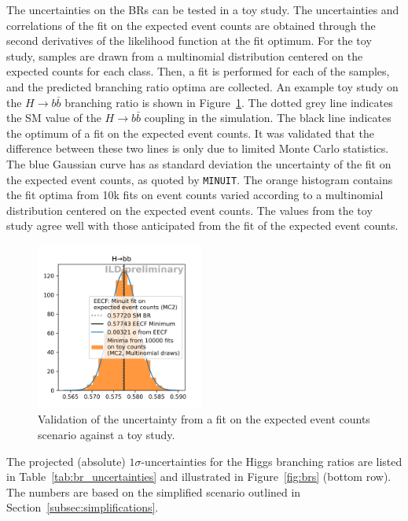 \documentclass[11pt, hidelinks, a4paper]{scrartcl}
\begin{document}
The uncertainties on the BRs can be tested in a toy study.
The uncertainties and correlations of the fit on the expected event counts
are obtained through the second derivatives of the likelihood function
at the fit optimum.
For the toy study, samples are drawn from a multinomial distribution centered on the
expected counts for each class.
Then, a fit is performed for each of the samples, and the predicted
branching ratio optima are collected.
An example toy study on the $H \to b \bar{b}$ branching ratio is shown in
Figure~\ref{fig:toys}.
The dotted grey line indicates the SM value of
the $H \to b \bar{b}$ coupling in the simulation.
The black line indicates the optimum of a fit on
the expected event counts.
It was validated that the difference between these two lines
is only due to limited Monte Carlo statistics.
The blue Gaussian curve has as standard deviation the uncertainty of
the fit on the expected event counts, as quoted by \texttt{MINUIT}.
The orange histogram contains the fit optima from
10k fits on event counts varied according to
a multinomial distribution centered on the expected event counts.
The values from the toy study agree well with those anticipated
from the fit of the expected event counts.

\begin{figure}[ht]
    \centering
    \includegraphics[width=0.49\textwidth, keepaspectratio]{H_bb}
    \caption{
        Validation of the uncertainty from
        a fit on the expected event counts scenario against a toy study.
    }\label{fig:toys}
\end{figure}

The projected (absolute) $1 \sigma$-uncertainties for the Higgs branching ratios
are listed in Table~\ref{tab:br_uncertainties}
and illustrated in Figure~\ref{fig:brs} (bottom row).
The numbers are based on the simplified scenario
outlined in Section~\ref{subsec:simplifications}.
\end{document}
